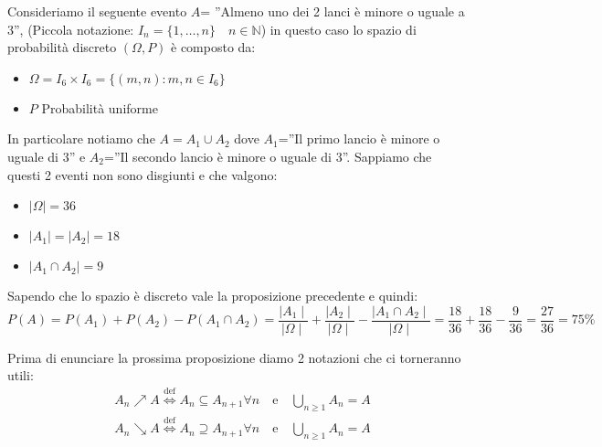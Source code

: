 \documentclass[11pt, a4paper, twoside]{article}
\begin{document}
\begin{es}
	Consideriamo il seguente evento $A$= ''Almeno uno dei 2 lanci è minore o uguale a 3'', (Piccola notazione: $I_n=\{1,\dots,n\}\quad n\in\mathbb{N}$) in questo caso lo spazio di probabilità discreto $(\Omega,P)$ è composto da:
	\begin{itemize}
		\item $\Omega=I_6\times I_6=\{(m,n):m,n \in I_6\}$ 
		\item $P$ Probabilità uniforme 
	\end{itemize}
	In particolare notiamo che $A=A_1\cup A_2$ dove $A_1$=''Il primo lancio è minore o uguale di 3'' e $A_2$=''Il secondo lancio è minore o uguale di 3''. Sappiamo che questi 2 eventi non sono disgiunti e che valgono:
	\begin{itemize}
		\item $\mid\Omega\mid=36$ 
		\item $\mid A_1\mid=\mid A_2\mid=18$
		\item $\mid A_1\cap A_2\mid=9$  
	\end{itemize}
	Sapendo che lo spazio è discreto vale la proposizione precedente e quindi:
	\[
		P(A)=P(A_1)+P(A_2)-P(A_1\cap A_2)=\frac{\mid A_1\mid}{\mid \Omega\mid}+\frac{\mid A_2\mid}{\mid \Omega\mid}-\frac{\mid A_1\cap A_2\mid}{\mid\Omega\mid}=\frac{18}{36}+\frac{18}{36}-\frac{9}{36}=\frac{27}{36}=75\%
	\]
\end{es}

Prima di enunciare la prossima proposizione diamo 2 notazioni che ci torneranno utili:
\begin{align*}
	&A_n\nearrow A\stackrel{\text{def}}{\iff} A_n\subseteq A_{n+1}\forall n\quad\text{e}\quad \bigcup\limits_{n\geq1}A_n=A \\
	&A_n\searrow A\stackrel{\text{def}}{\iff} A_n\supseteq A_{n+1}\forall n\quad\text{e}\quad \bigcup\limits_{n\geq1}A_n=A
\end{align*}
\end{document}
